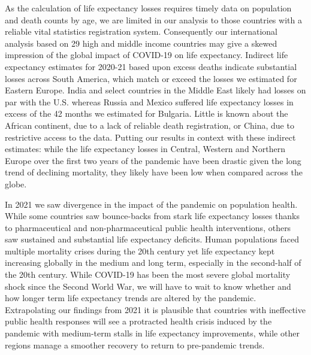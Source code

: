 \documentclass[12pt]{article}
\begin{document}
As the calculation of life expectancy losses requires timely data on population and death counts by age, we are limited in our analysis to those countries with a reliable vital statistics registration system. Consequently our international analysis based on 29 high and middle income countries may give a skewed impression of the global impact of COVID-19 on life expectancy. Indirect life expectancy estimates for 2020-21 based upon excess deaths \citealp{Heuveline2022} indicate substantial losses across South America, which match or exceed the losses we estimated for Eastern Europe. India and select countries in the Middle East likely had losses on par with the U.S. whereas Russia and Mexico suffered life expectancy losses in excess of the 42 months we estimated for Bulgaria. Little is known about the African continent, due to a lack of reliable death registration, or China, due to restrictive access to the data. Putting our results in context with these indirect estimates: while the life expectancy losses in Central, Western and Northern Europe over the first two years of the pandemic have been drastic given the long trend of declining mortality, they likely have been low when compared across the globe.

In 2021 we saw divergence in the impact of the pandemic on population health. While some countries saw bounce-backs from stark life expectancy losses thanks to pharmaceutical and non-pharmaceutical public health interventions, others saw sustained and substantial life expectancy deficits. Human populations faced multiple mortality crises during the 20th century yet life expectancy kept increasing globally in the medium and long term, especially in the second-half of the 20th century. While COVID-19 has been the most severe global mortality shock since the Second World War, we will have to wait to know  whether and how longer term life expectancy trends are altered by the pandemic. Extrapolating our findings from 2021 it is plausible that countries with ineffective public health responses will see a protracted health crisis induced by the pandemic with medium-term stalls in life expectancy improvements, while other regions manage a smoother recovery to return to pre-pandemic trends.

\end{document}
